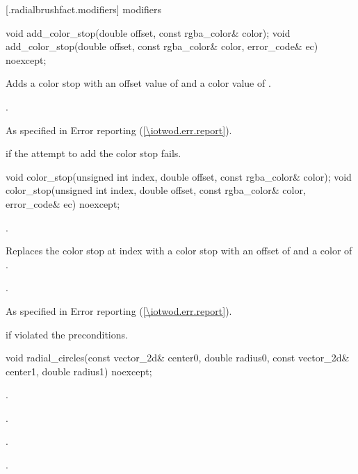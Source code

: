  [\iotwod.radialbrushfact.modifiers] { modifiers}

\begin{itemdecl}
    void add_color_stop(double offset, const rgba_color& color);
    void add_color_stop(double offset, const rgba_color& color,
      error_code& ec) noexcept;
\end{itemdecl}
\begin{itemdescr}
	\pnum
	\effects
	Adds a color stop with an offset value of  and a color value of .
	
	\pnum
	\postconditions
	.
	
	\pnum
	\throws
	As specified in Error reporting (\ref{\iotwod.err.report}).
	
	\pnum
	\errors
	 if the attempt to add the color stop fails.
	
\end{itemdescr}

\begin{itemdecl}
    void color_stop(unsigned int index, double offset, const rgba_color& color);
    void color_stop(unsigned int index, double offset, const rgba_color& color,
      error_code& ec) noexcept;
\end{itemdecl}
\begin{itemdescr}
	\pnum
	\requires
	.
	
	\pnum
	\effects
	Replaces the color stop at index  with a color stop with an offset of  and a color of .

	\pnum
	\postconditions
	.
	
	\pnum
	\throws
	As specified in Error reporting (\ref{\iotwod.err.report}).
	
	\pnum
	\errors
	 if  violated the preconditions.

\end{itemdescr}

\begin{itemdecl}
    void radial_circles(const vector_2d& center0, double radius0,
      const vector_2d& center1, double radius1) noexcept;
\end{itemdecl}
\begin{itemdescr}
	\pnum
	\postconditions
	.
	
	\pnum
	.
	
	\pnum
	.

	\pnum
	.

\end{itemdescr}

